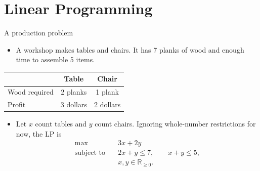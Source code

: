 \documentclass[aspectratio=169]{beamer}
\begin{document}
\section{Linear Programming}
\frame{\sectionpage}
\begin{frame}{A production problem}
\begin{itemize}
\item A workshop makes tables and chairs. It has 7 planks of wood and enough time to assemble 5 items.
\pause
\end{itemize}
\begin{center}
\begin{tabular}{lcc}
 & Table & Chair\\\hline
Wood required & 2 planks & 1 plank\\
Profit & 3 dollars & 2 dollars
\end{tabular}
\end{center}
\pause
\begin{itemize}
\item Let $x$ count tables and $y$ count chairs. Ignoring whole-number restrictions for now, the LP is
\[
\begin{aligned}
\max\quad &3x+2y\\
\text{subject to}\quad &2x+y\leq7,\qquad x+y\leq5,\\
&x,y\in\mathbb R_{\geq0}.
\end{aligned}
\]
\end{itemize}
\end{frame}
\end{document}
